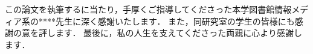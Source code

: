 この論文を執筆するに当たり，手厚くご指導してくださった本学図書館情報メディア系の****先生に深く感謝いたします．
また，同研究室の学生の皆様にも感謝の意を評します．
最後に，私の人生を支えてくださった両親に心より感謝します．